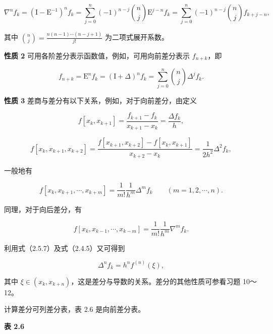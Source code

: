 \documentclass[
  10pt,
  fontset=fandol]{ctexart}
\begin{document}
\[
\nabla^n f_k=(\mathrm{I}-\mathrm{E}^{-1})^n f_k
=\sum_{j=0}^{n}(-1)^{n-j}\binom{n}{j}\mathrm{E}^{j-n}f_k
=\sum_{j=0}^{n}(-1)^{n-j}\binom{n}{j}f_{k+j-n},
\tag{2.5.5}
\]

其中 \(\displaystyle\binom{n}{j}=\frac{n(n-1)\cdots(n-j+1)}{j!}\) 为二项式展开系数。

\textbf{性质 2} 可用各阶差分表示函数值，例如，可用向前差分表示 \(f_{n+k}\)，即

\[
f_{n+k}=\mathrm{E}^n f_k=(\mathrm{I}+\Delta)^n f_k=\sum_{j=0}^{n}\binom{n}{j}\Delta^j f_k.
\tag{2.5.6}
\]

\textbf{性质 3} 差商与差分有以下关系，例如，对于向前差分，由定义

\[
f[x_k,x_{k+1}]=\frac{f_{k+1}-f_k}{x_{k+1}-x_k}=\frac{\Delta f_k}{h},
\]

\[
f[x_k,x_{k+1},x_{k+2}]=\frac{f[x_{k+1},x_{k+2}]-f[x_k,x_{k+1}]}{x_{k+2}-x_k}=\frac{1}{2h^2}\Delta^2 f_k,
\]

一般地有

\[
f[x_k,x_{k+1},\cdots,x_{k+m}]=\frac{1}{m!}\frac{1}{h^m}\Delta^m f_k\qquad(m=1,2,\cdots,n).
\tag{2.5.7}
\]

同理，对于向后差分，有

\[
f[x_k,x_{k-1},\cdots,x_{k-m}]=\frac{1}{m!}\frac{1}{h^m}\nabla^m f_k.
\tag{2.5.8}
\]

利用式（2.5.7）及式（2.4.5）又可得到

\[
\Delta^n f_k=h^n f^{(n)}(\xi),
\tag{2.5.9}
\]

其中 \(\xi\in(x_k,x_{k+n})\)，这是差分与导数的关系。差分的其他性质可参看习题 10～12。

计算差分可列差分表，表 2.6 是向前差分表。

\textbf{表 2.6}
\end{document}
